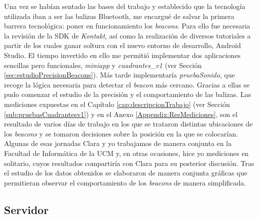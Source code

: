 Una vez se habían sentado las bases del trabajo y establecido que la tecnología utilizada iban a ser las balizas Bluetooth, me encargué de salvar la primera barrera tecnológica: poner en funcionamiento los \textit{beacons}. Para ello fue necesaria la revisión de la SDK de \textit{Kontakt}, así como la realización de diversos tutoriales a partir de los cuales ganar soltura con el nuevo entorno de desarrollo, Android Studio. El tiempo invertido en ello me permitió implementar dos aplicaciones sencillas pero funcionales, \textit{miniapp} y \textit{cuadrantes\_v1} (ver Sección \ref{sec:estudioPrecisionBeacons}). Más tarde implementaría \textit{pruebaSonido}, que recoge la lógica necesaria para detectar el \textit{beacon} más cercano. Gracias a ellas se pudo comenzar el estudio de la precisión y el comportamiento de las balizas. Las mediciones expuestas en el Capítulo \ref{cap:descripcionTrabajo} (ver Sección \ref{sub:pruebasCuadrantesv1}) y en el Anexo \ref{Appendix:ResMediciones}, son el resultado de varios días de trabajo en los que se trataron distintas ubicaciones de los \textit{beacons} y se tomaron decisiones sobre la posición en la que se colocarían. Algunas de esas jornadas Clara y yo trabajamos de manera conjunta en la Facultad de Informática de la UCM y, en otras ocasiones, hice yo mediciones en solitario, cuyos resultados compartiría con Clara para su posterior discusión. Tras el estudio de los datos obtenidos se elaboraron de manera conjunta gráficas que permitieran observar el comportamiento de los \textit{beacons} de manera simplificada.

\subsection{Servidor}

